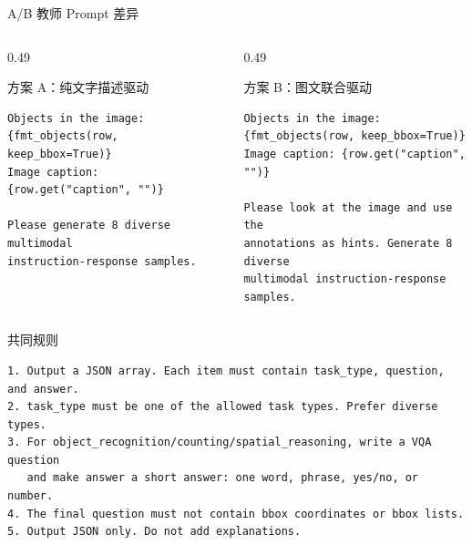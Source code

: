 \documentclass{beamer}
\begin{document}
\begin{frame}[fragile,shrink=5]{A/B 教师 Prompt 差异}
\small
\begin{columns}[T,onlytextwidth]
\begin{column}{0.49\textwidth}
\begin{block}{方案 A：纯文字描述驱动}
\tiny
\begin{verbatim}
Objects in the image:
{fmt_objects(row, keep_bbox=True)}
Image caption: {row.get("caption", "")}

Please generate 8 diverse multimodal
instruction-response samples.
\end{verbatim}
\end{block}
\end{column}
\begin{column}{0.49\textwidth}
\begin{block}{方案 B：图文联合驱动}
\tiny
\begin{verbatim}
Objects in the image:
{fmt_objects(row, keep_bbox=True)}
Image caption: {row.get("caption", "")}

Please look at the image and use the
annotations as hints. Generate 8 diverse
multimodal instruction-response samples.
\end{verbatim}
\end{block}
\end{column}
\end{columns}
\vspace{0.2em}
\begin{block}{共同规则}
\tiny
\begin{verbatim}
1. Output a JSON array. Each item must contain task_type, question, and answer.
2. task_type must be one of the allowed task types. Prefer diverse types.
3. For object_recognition/counting/spatial_reasoning, write a VQA question
   and make answer a short answer: one word, phrase, yes/no, or number.
4. The final question must not contain bbox coordinates or bbox lists.
5. Output JSON only. Do not add explanations.
\end{verbatim}
\end{block}
\end{frame}
\end{document}
